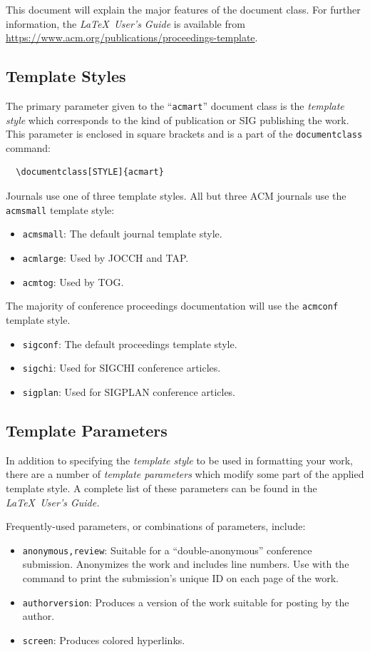 \documentclass[sigconf, review]{acmart}
\begin{document}
This document will explain the major features of the document
class. For further information, the {\itshape \LaTeX\ User's Guide} is
available from
\url{https://www.acm.org/publications/proceedings-template}.

\subsection{Template Styles}

The primary parameter given to the ``\verb|acmart|'' document class is
the {\itshape template style} which corresponds to the kind of publication
or SIG publishing the work. This parameter is enclosed in square
brackets and is a part of the {\verb|documentclass|} command:
\begin{verbatim}
  \documentclass[STYLE]{acmart}
\end{verbatim}

Journals use one of three template styles. All but three ACM journals
use the {\verb|acmsmall|} template style:
\begin{itemize}
\item {\texttt{acmsmall}}: The default journal template style.
\item {\texttt{acmlarge}}: Used by JOCCH and TAP.
\item {\texttt{acmtog}}: Used by TOG.
\end{itemize}

The majority of conference proceedings documentation will use the {\verb|acmconf|} template style.
\begin{itemize}
\item {\texttt{sigconf}}: The default proceedings template style.
\item{\texttt{sigchi}}: Used for SIGCHI conference articles.
\item{\texttt{sigplan}}: Used for SIGPLAN conference articles.
\end{itemize}

\subsection{Template Parameters}

In addition to specifying the {\itshape template style} to be used in
formatting your work, there are a number of {\itshape template parameters}
which modify some part of the applied template style. A complete list
of these parameters can be found in the {\itshape \LaTeX\ User's Guide.}

Frequently-used parameters, or combinations of parameters, include:
\begin{itemize}
\item {\texttt{anonymous,review}}: Suitable for a ``double-anonymous''
  conference submission. Anonymizes the work and includes line
  numbers. Use with the \texttt{\string\acmSubmissionID} command to print the
  submission's unique ID on each page of the work.
\item{\texttt{authorversion}}: Produces a version of the work suitable
  for posting by the author.
\item{\texttt{screen}}: Produces colored hyperlinks.
\end{itemize}
\end{document}

